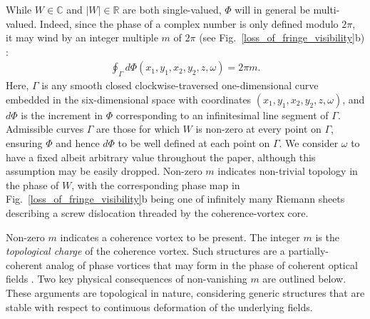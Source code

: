 \documentclass[%
 reprint,
 amsmath,amssymb,
 aps,
]{revtex4-1}
\begin{document}
While $W\in\mathbb{C}$ and $|W|\in\mathbb{R}$ are both single-valued, $\Phi$ will in general be multi-valued. Indeed, since the phase of a complex number is only defined modulo $2\pi$, it may wind by an integer multiple $m$ of $2\pi$ (see Fig.~\ref{loss_of_fringe_visibility}b) \cite{GburVisser2003}: 
\begin{equation}
\begin{aligned}
\label{phase_of_W_winding}
\oint_{\Gamma} d\Phi(x_1,y_1,x_2,y_2,z,\omega)=2\pi m.
\end{aligned}
\end{equation}
Here, $\Gamma$ is any smooth closed clockwise-traversed one-dimensional curve embedded in the six-dimensional space with coordinates $(x_1,y_1,x_2,y_2,z,\omega)$, and $d\Phi$ is the increment in $\Phi$ corresponding to an infinitesimal line segment of $\Gamma$.  Admissible curves $\Gamma$ are those for which $W$ is non-zero at every point on $\Gamma$, ensuring $\Phi$ and hence $d\Phi$ to be well defined at each point on $\Gamma$.  We consider $\omega$ to have a fixed albeit arbitrary value throughout the paper, although this assumption may be easily dropped. Non-zero $m$ indicates non-trivial topology in the phase of $W$, with the corresponding phase map in Fig.~\ref{loss_of_fringe_visibility}b being one of infinitely many Riemann sheets describing a screw dislocation threaded by the coherence-vortex core. 

Non-zero $m$ indicates a coherence vortex \cite{GburVisser2003} to be present.  The integer $m$ is the {\em topological charge} of the coherence vortex.  Such structures are a partially-coherent analog of phase vortices that may form in the phase of coherent optical fields \cite{NyeBerry1974,Nye1999,SoskinVasnetsov2001,DennisProgOpt2009}.  Two key physical consequences of non-vanishing $m$ are outlined below.  These arguments are topological in nature, considering  generic structures that are stable with respect to continuous deformation of the underlying fields. 
\end{document}
